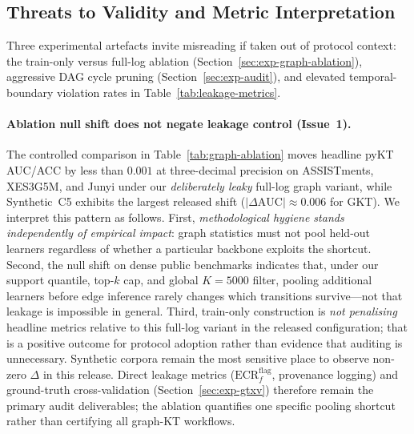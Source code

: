 \documentclass[pdflatex,sn-basic]{sn-jnl}
\begin{document}
\subsection{Threats to Validity and Metric Interpretation}
\label{sec:threats-validity}
Three experimental artefacts invite misreading if taken out of protocol
context: the train-only versus full-log ablation (Section~\ref{sec:exp-graph-ablation}),
aggressive DAG cycle pruning (Section~\ref{sec:exp-audit}), and elevated
temporal-boundary violation rates in Table~\ref{tab:leakage-metrics}.

\paragraph{Ablation null shift does not negate leakage control (Issue~1).}
The controlled comparison in Table~\ref{tab:graph-ablation} moves headline
pyKT AUC/ACC by less than $0.001$ at three-decimal precision on
ASSISTments, XES3G5M, and Junyi under our \emph{deliberately leaky}
full-log graph variant, while Synthetic~C5 exhibits the largest released
shift ($|\Delta\text{AUC}|{\approx}0.006$ for GKT).
We interpret this pattern as follows.
First, \emph{methodological hygiene stands independently of empirical
impact}: graph statistics must not pool held-out learners regardless of
whether a particular backbone exploits the shortcut.
Second, the null shift on dense public benchmarks indicates that, under
our support quantile, top-$k$ cap, and global $K{=}5000$ filter, pooling
additional learners before edge inference rarely changes which transitions
survive---not that leakage is impossible in general.
Third, train-only construction is \emph{not penalising} headline metrics
relative to this full-log variant in the released configuration; that is a
positive outcome for protocol adoption rather than evidence that auditing
is unnecessary.
Synthetic corpora remain the most sensitive place to observe non-zero
$\Delta$ in this release.
Direct leakage metrics ($\mathrm{ECR}^{\mathrm{flag}}_f$, provenance
logging) and ground-truth cross-validation (Section~\ref{sec:exp-gtxv})
therefore remain the primary audit deliverables; the ablation quantifies
one specific pooling shortcut rather than certifying all graph-KT workflows.
\end{document}
